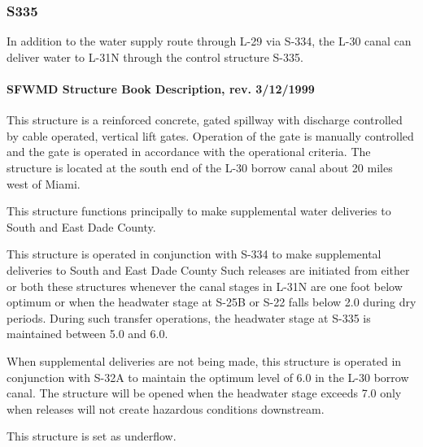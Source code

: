 \clearpage
\subsubsection{S335}
In addition to the water supply route through L-29 via S-334, the L-30 canal can deliver water to L-31N through the control structure S-335.

\paragraph{SFWMD Structure Book Description, rev. 3/12/1999}
This structure is a reinforced concrete, gated spillway with discharge controlled by cable operated, vertical lift gates.
Operation of the gate is manually controlled and the gate is operated in accordance with the operational criteria.
The structure is located at the south end of the L-30 borrow canal about 20 miles west of Miami.

This structure functions principally to make supplemental water deliveries to South and East Dade County.

This structure is operated in conjunction with S-334 to make supplemental deliveries to South and East Dade County
Such releases are initiated from either or both these structures whenever the canal stages in L-31N are one foot below optimum or when the headwater stage at S-25B or S-22 falls below 2.0 during dry periods.
During such transfer operations, the headwater stage at S-335 is maintained between 5.0 and 6.0.

When supplemental deliveries are not being made, this structure is operated in conjunction with S-32A to maintain the optimum level of 6.0 in the L-30 borrow canal.
The structure will be opened when the headwater stage exceeds 7.0 only when releases will not create hazardous conditions downstream.

This structure is set as underflow.

